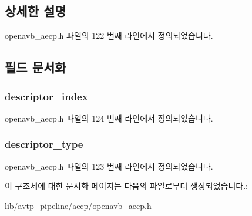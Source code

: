 \subsection{상세한 설명}


openavb\+\_\+aecp.\+h 파일의 122 번째 라인에서 정의되었습니다.



\subsection{필드 문서화}
\subsubsection[{\texorpdfstring{descriptor\+\_\+index}{descriptor_index}}]{ descriptor\+\_\+index}\hypertarget{structopenavb__aecp__command__data__get__stream__format__t_ab26fb363c24b9a2a4391f9171c981b08}{}\label{structopenavb__aecp__command__data__get__stream__format__t_ab26fb363c24b9a2a4391f9171c981b08}


openavb\+\_\+aecp.\+h 파일의 124 번째 라인에서 정의되었습니다.

\subsubsection[{\texorpdfstring{descriptor\+\_\+type}{descriptor_type}}]{ descriptor\+\_\+type}\hypertarget{structopenavb__aecp__command__data__get__stream__format__t_a1e231d7874aada5925b29affc76782cc}{}\label{structopenavb__aecp__command__data__get__stream__format__t_a1e231d7874aada5925b29affc76782cc}


openavb\+\_\+aecp.\+h 파일의 123 번째 라인에서 정의되었습니다.



이 구조체에 대한 문서화 페이지는 다음의 파일로부터 생성되었습니다.\+:\begin{DoxyCompactItemize}
\item 
lib/avtp\+\_\+pipeline/aecp/\hyperlink{openavb__aecp_8h}{openavb\+\_\+aecp.\+h}\end{DoxyCompactItemize}
